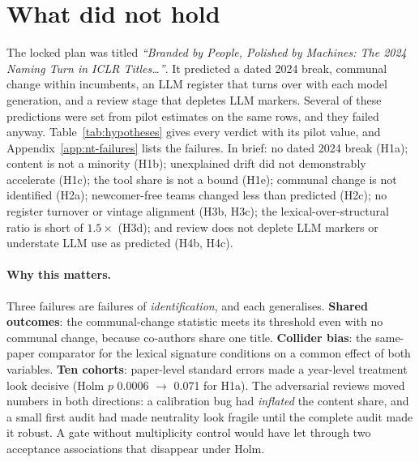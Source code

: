 \section{What did not hold}
\label{sec:nt-failures}

The locked plan was titled \emph{``Branded by People, Polished by Machines: The 2024 Naming Turn in ICLR Titles\ldots''}. It predicted a dated 2024 break, communal change within incumbents, an LLM register that turns over with each model generation, and a review stage that depletes LLM markers. Several of these predictions were set from pilot estimates on the same rows, and they failed anyway. Table~\ref{tab:hypotheses} gives every verdict with its pilot value, and Appendix~\ref{app:nt-failures} lists the failures. In brief: no dated 2024 break (H1a); content is not a minority (H1b); unexplained drift did not demonstrably accelerate (H1c); the tool share is not a bound (H1e); communal change is not identified (H2a); newcomer-free teams changed less than predicted (H2c); no register turnover or vintage alignment (H3b, H3c); the lexical-over-structural ratio is short of $1.5\times$ (H3d); and review does not deplete LLM markers or understate LLM use as predicted (H4b, H4c).

\paragraph{Why this matters.}
Three failures are failures of \emph{identification}, and each generalises. \textbf{Shared outcomes}: the communal-change statistic meets its threshold even with no communal change, because co-authors share one title. \textbf{Collider bias}: the same-paper comparator for the lexical signature conditions on a common effect of both variables. \textbf{Ten cohorts}: paper-level standard errors made a year-level treatment look decisive (Holm $p$ 0.0006 $\rightarrow$ 0.071 for H1a). The adversarial reviews moved numbers in both directions: a calibration bug had \emph{inflated} the content share, and a small first audit had made \NAME{} neutrality look fragile until the complete audit made it robust. A gate without multiplicity control would have let through two acceptance associations that disappear under Holm.
